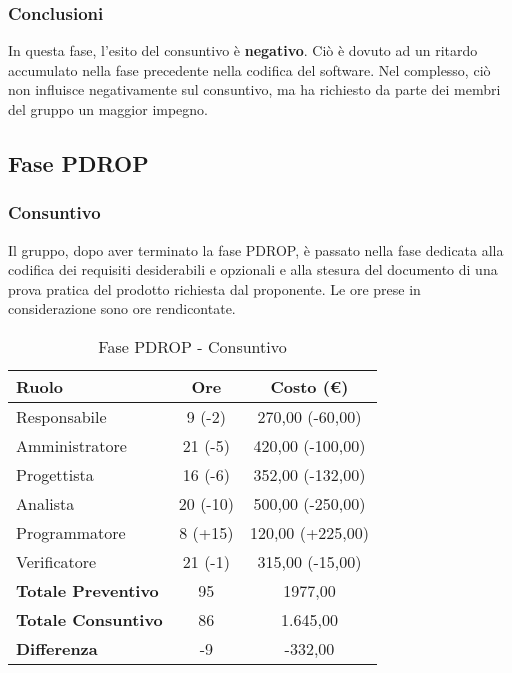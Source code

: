 \documentclass[../PianoProgetto.tex]{subfiles}
\begin{document}
	\subsubsection{Conclusioni}	
     In questa fase, l'esito del consuntivo è \textbf{negativo}. 
     Ciò è dovuto ad un ritardo accumulato nella fase precedente nella codifica del software\g. Nel complesso, ciò non influisce negativamente sul consuntivo, ma ha richiesto da parte dei membri del gruppo un maggior impegno.
     
     
     \subsection{Fase PDROP}
	\subsubsection{Consuntivo}
	Il gruppo, dopo aver terminato la fase PDROP, è passato nella fase dedicata alla codifica dei requisiti desiderabili e opzionali e alla stesura del documento di una prova pratica del prodotto richiesta dal proponente. Le ore prese in considerazione sono ore rendicontate.
	
	\newpage
	\begin{table}[h]
		\centering
		\begin{tabular}{l * {2}{c}}
			\toprule
			\textbf{Ruolo} & \textbf{Ore} & \textbf{Costo (\euro{})} \\
			\midrule
			Responsabile &		9 (-2) & 270,00 (-60,00) \\
			Amministratore &	21 (-5) & 420,00  (-100,00) \\
			Progettista & 		16 (-6) & 352,00  (-132,00)\\
			Analista & 			20	(-10)	& 500,00   (-250,00)       \\
			Programmatore & 	8	(+15)	& 120,00 	(+225,00)			\\
			Verificatore & 		21 (-1) & 315,00 (-15,00)	\\
			\midrule
			\textbf{Totale Preventivo} & 95
			& 1977,00
			\\		
			\textbf{Totale Consuntivo} & 86 & 1.645,00
			\\
			\midrule
			\textbf{Differenza} & -9 & -332,00 \\
			\bottomrule
		\end{tabular}
		
		\caption{Fase PDROP - Consuntivo}
		\label{tab:consuntivoPDROP}
		
	\end{table}			
	
\end{document}

